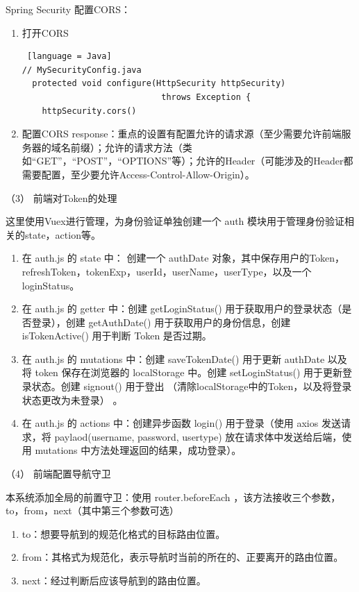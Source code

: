 Spring Security 配置CORS：

\begin{enumerate}[label=\circled{\arabic*}]
  \item 打开CORS \begin{lstlisting} [language = Java]
// MySecurityConfig.java
  protected void configure(HttpSecurity httpSecurity) 
                            throws Exception {
    httpSecurity.cors()
              \end{lstlisting}
  \item 配置CORS response：重点的设置有配置允许的请求源（至少需要允许前端服务器的域名前缀）；允许的请求方法（类如“GET”，“POST”，“OPTIONS”等）；允许的Header（可能涉及的Header都需要配置，至少要允许Access-Control-Allow-Origin）。
\end{enumerate}

（3） 前端对Token的处理

这里使用Vuex进行管理，为身份验证单独创建一个 auth 模块用于管理身份验证相关的state，action等。
\begin{enumerate}[label=\circled{\arabic*}]
  \item 在 auth.js 的 state 中： 创建一个 authDate 对象，其中保存用户的Token，refreshToken，tokenExp，userId，userName，userType，以及一个loginStatus。
  \item 在 auth.js 的 getter 中：创建 getLoginStatus() 用于获取用户的登录状态（是否登录），创建 getAuthDate() 用于获取用户的身份信息，创建 isTokenActive() 用于判断 Token 是否过期。
  \item 在 auth.js 的 mutations 中：创建 saveTokenDate() 用于更新 authDate 以及 将 token 保存在浏览器的 localStorage 中。创建 setLoginStatus() 用于更新登录状态。创建 signout() 用于登出 （清除localStorage中的Token，以及将登录状态更改为未登录） 。
  \item 在 auth.js 的 actions 中：创建异步函数 login() 用于登录（使用 axios 发送请求，将 paylaod(username, password, usertype) 放在请求体中发送给后端，使用 mutations 中方法处理返回的结果，成功登录）。
\end{enumerate}

（4） 前端配置导航守卫

本系统添加全局的前置守卫：使用  router.beforeEach ，该方法接收三个参数，to，from，next（其中第三个参数可选）

\begin{enumerate}[label=\circled{\arabic*}]
  \item to：想要导航到的规范化格式的目标路由位置。
  \item from：其格式为规范化，表示导航时当前的所在的、正要离开的路由位置。
  \item next：经过判断后应该导航到的路由位置。
\end{enumerate}

